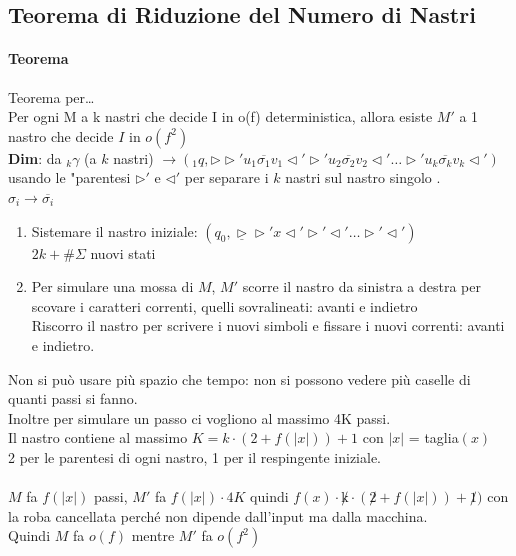 \documentclass[10pt]{book}
\begin{document}
\subsection{Teorema di Riduzione del Numero di Nastri}
\paragraph{Teorema} Teorema per\ldots\\
Per ogni M a k nastri che decide I in o(f) deterministica, allora esiste $M'$ a 1 nastro che decide $I$ in $o(f^2)$\\
\textbf{Dim}: da $_k\gamma$ (a $k$ nastri) $\longrightarrow (_1q, \triangleright \triangleright' u_1 \overline{\sigma_1} v_1 \triangleleft' \triangleright' u_2 \overline{\sigma_2} v_2 \triangleleft'\ldots \triangleright' u_k \overline{\sigma_k} v_k \triangleleft')$ usando le "parentesi $\triangleright'$ e $\triangleleft'$ per separare i $k$ nastri sul nastro singolo .\\
$\sigma_i \longrightarrow \overline{\sigma_i}$
\begin{enumerate}
	\item Sistemare il nastro iniziale: $(q_0,\underline{\triangleright} \triangleright' x \triangleleft' \triangleright' \triangleleft' \ldots \triangleright' \triangleleft' )$\\$2k + \#\Sigma$ nuovi stati
	\item Per simulare una mossa di $M$, $M'$ scorre il nastro da sinistra a destra per scovare i caratteri correnti, quelli sovralineati: avanti e indietro\\
	Riscorro il nastro per scrivere i nuovi simboli e fissare i nuovi correnti: avanti e indietro.
\end{enumerate}
Non si può usare più spazio che tempo: non si possono vedere più caselle di quanti passi si fanno.\\ Inoltre per simulare un passo ci vogliono al massimo 4K passi.\\
Il nastro contiene al massimo $K = k\cdot (2 + f(|x|)) + 1$ con $|x|$ = taglia$(x)$\\
2 per le parentesi di ogni nastro, 1 per il respingente iniziale.\\\\
$M$ fa $f(|x|)$ passi, $M'$ fa $f(|x|) \cdot 4K$ quindi $f(x) \cdot \not k \cdot (\not 2 + f(|x|)) + \not 1)$ con la roba cancellata perché non dipende dall'input ma dalla macchina.\\
Quindi $M$ fa $o(f)$ mentre $M'$ fa $o(f^2)$
\end{document}

